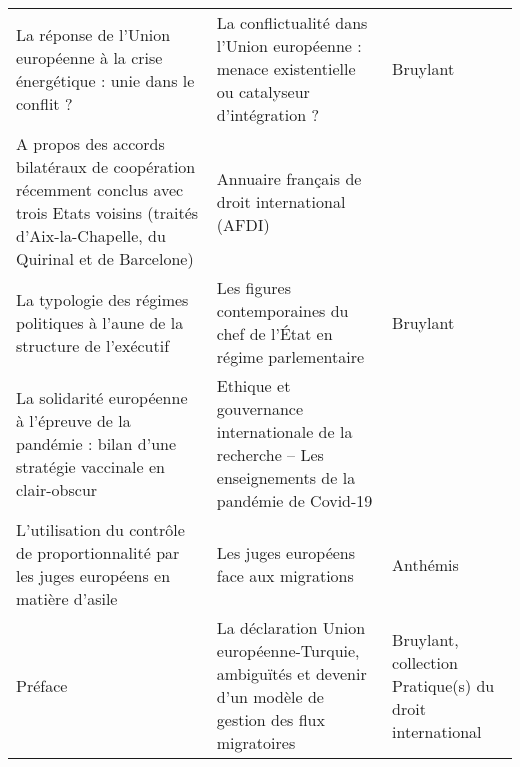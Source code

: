 \begin{longtable}{p{.4\linewidth}p{.35\linewidth}p{.15\linewidth}}
La réponse de l’Union européenne à la crise énergétique : unie dans le conflit ? & La conflictualité dans l’Union européenne : menace existentielle ou catalyseur d’intégration ? & Bruylant \\
A propos des accords bilatéraux de coopération récemment conclus avec trois Etats voisins (traités d’Aix-la-Chapelle, du Quirinal et de Barcelone) & Annuaire français de droit international (AFDI) &  \\
La typologie des régimes politiques à l’aune de la structure de l’exécutif & Les figures contemporaines du chef de l’État en régime parlementaire & Bruylant \\
La solidarité européenne à l’épreuve de la pandémie : bilan d’une stratégie vaccinale en clair-obscur & Ethique et gouvernance internationale de la recherche – Les enseignements de la pandémie de Covid-19 &  \\
L’utilisation du contrôle de proportionnalité par les juges européens en matière d’asile & Les juges européens face aux migrations & Anthémis \\
Préface & La déclaration Union européenne-Turquie, ambiguïtés et devenir d’un modèle de gestion des flux migratoires & Bruylant, collection Pratique(s) du droit international \\
\bottomrule
\end{longtable}
